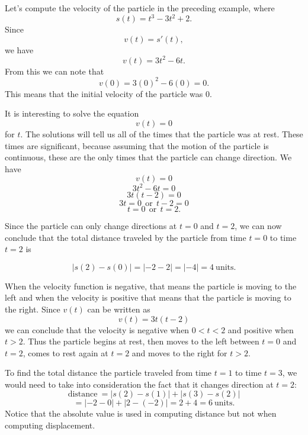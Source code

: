 \documentclass{ximera}
\begin{document}
 
\begin{example}[example 2] Let's compute the velocity of the particle in the preceding example, where
\[s(t) = t^3 - 3t^2 + 2.\]
Since 
\[v(t) = s'(t),\]
we have
\[v(t) = 3t^2 - 6t.\]
From this we can note that
\[v(0) = 3(0)^2 - 6(0) = 0.\]
This means that the initial velocity of the particle was 0.  

It is interesting to solve the equation 
\[v(t) = 0\]
for $t$. The solutions will tell us all of the times that the particle was at rest. These times are significant, 
because assuming that the motion of the particle is continuous, 
these are the only times that the particle can change direction.
We have
\[v(t) = 0\]
\[3t^2 - 6t = 0\]
\[3t(t-2) = 0\]
\[3t = 0 \ \ \text{or} \ \ t-2 = 0\]
\[t = 0 \ \ \text{or} \ \ t = 2.\]

Since the particle can only change directions at $t=0$ and $t=2$, we can now conclude that the 
total distance traveled by the particle from time $t=0$ to time $t=2$ is 

\[|s(2) - s(0)| = |-2 - 2| = |-4| = 4 \ \text{units.}\]

When the velocity function is negative, that means the particle is moving to the left and when the 
velocity is positive that means that the particle is moving to the right. Since $v(t)$ can be written as
\[v(t) = 3t(t-2)\]
we can conclude that the velocity is negative when $0<t<2$ and positive when $t>2$.
Thus the particle begins at rest, then moves to the left between $t = 0$ and $t = 2$, comes to rest again at $t=2$
and moves to the right for $t>2$.

To find the total distance the particle traveled from time $t = 1$ to time $t = 3$, we would need to take into consideration
the fact that it changes direction at $t = 2$:
\[ \text{distance} \  = |s(2) - s(1)| + |s(3) -s(2)|\]
\[= |-2-0|+|2-(-2)| = 2 + 4 = 6 \ \text{units}.\]
Notice that the absolute value is used in computing distance but not when computing displacement.




\begin{center}
\end{center}


\begin{center}
\end{center}


\end{example}
\end{document}
